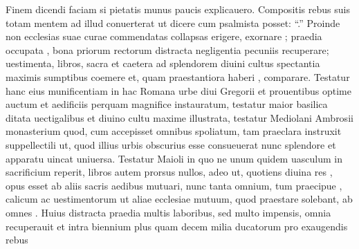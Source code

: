 \documentclass[a5paper,twoside]{article}
\begin{document}
Finem dicendi faciam si   pietatis munus paucis explicauero.  Compositis rebus suis totam mentem ad illud conuerterat ut dicere cum psalmista  posset: ``.''  Proinde non  ecclesias suae curae commendatas collapsas erigere, exornare ; praedia occupata , bona priorum rectorum distracta negligentia  pecuniis recuperare; uestimenta, libros,  sacra et caetera ad splendorem diuini cultus spectantia maximis sumptibus coemere et, quam praestantiora haberi , comparare.  Testatur hanc eius munificentiam in hac Romana urbe diui Gregorii  et prouentibus optime auctum et aedificiis perquam magnifice instauratum, testatur  maior basilica  ditata uectigalibus et diuino cultu maxime illustrata, testatur Mediolani Ambrosii monasterium quod, cum accepisset omnibus  spoliatum, tam praeclara instruxit suppellectili ut, quod   illius urbis obscurius esse consueuerat nunc splendore et  apparatu uincat uniuersa. Testatur  Maioli  in quo ne unum quidem uasculum in sacrificium reperit, libros autem prorsus nullos, adeo ut, quotiens diuina res , opus esset ab aliis sacris aedibus  mutuari, nunc tanta  omnium, tum praecipue , calicum ac uestimentorum  ut aliae ecclesiae mutuum, quod praestare solebant, ab  omnes .  Huius   distracta praedia multis laboribus, sed multo  impensis, omnia recuperauit et intra biennium plus quam decem milia ducatorum pro exaugendis rebus 
\end{document}
